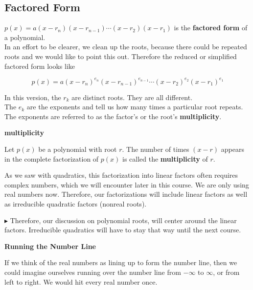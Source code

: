 \documentclass{ximera}
\begin{document}
\subsection*{Factored Form}


$p(x) = a (x-r_n)(x-r_{n-1})  \cdots (x-r_2)(x-r_1)$ is the \textbf{factored form} of a polynomial.  \\

In an effort to be clearer, we clean up the roots, because there could be repeated roots and we would like to point this out.  Therefore the reduced or simplified factored form looks like




\[   p(x) = a (x-r_n)^{e_n} (x-r_{n-1})^{e_{n-1}}  \cdots (x-r_2)^{e_2} (x-r_1)^{e_1}  \]



In this version, the $r_k$ are distinct roots.  They are all different. \\
The $e_k$ are the exponents and tell us how many times a particular root repeats.  The exponents are referred to as the factor's or the root's \textbf{multiplicity}.\\




\begin{definition} \textbf{\textcolor{green!50!black}{multiplicity}} 

Let $p(x)$ be a polynomial with root $r$.  The number of times $(x - r)$ appears in the complete factorization of $p(x)$ is called the \textbf{multiplicity} of $r$.

\end{definition}

As we saw with quadratics, this factorization into linear factors often requires complex numbers, which we will encounter later in this course. We are only using real numbers now.  Therefore, our factorizations will include linear factors as well as irreducible quadratic factors (nonreal roots).

\textbf{\textcolor{red!90!darkgray}{$\blacktriangleright$}}  Therefore, our discussion on polynomial roots, will center around the linear factors.  Irreducible quadratics will have to stay that way until the next course.










\textbf{\large Running the Number Line}

If we think of the real numbers as lining up to form the number line, then we could imagine ourselves running over the number line from $-\infty$ to $\infty$, or from left to right.  We would hit every real number once.  \\
\end{document}
